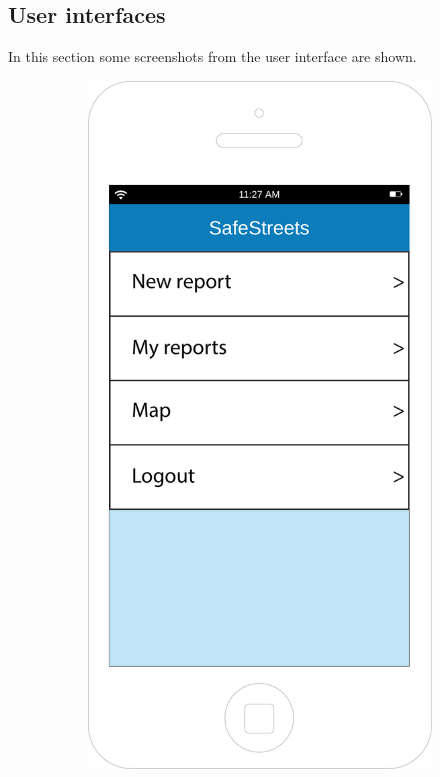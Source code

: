 \documentclass[12pt,a4paper]{report}
\begin{document}
		\subsection{User interfaces}
		In this section some screenshots from the user interface are shown. 
		\begin{figure}[h]
		\begin{subfigure}{0.5\textwidth}
			\includegraphics[scale=0.25, center]{Home}

\end{subfigure}
\end{figure}
\end{document}
